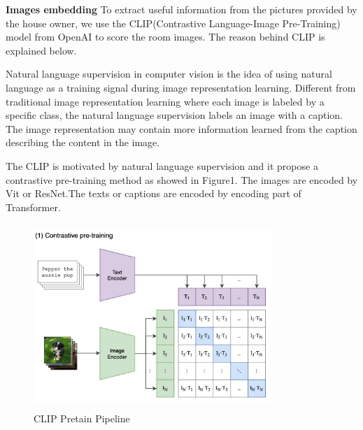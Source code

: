 \documentclass[final]{cvpr}
\begin{document}
\textbf{Images embedding}
To extract useful information from the pictures provided by the house owner, we use the CLIP(Contrastive Language-Image Pre-Training) model from OpenAI \cite{ref1} to score the room images. The reason behind CLIP is explained below.

Natural language supervision in computer vision is the idea of using natural language as a training signal during image representation learning. Different from traditional image representation learning where each image is labeled by a specific class, the natural language supervision labels an image with a caption. The image representation may contain more information learned from the caption describing the content in the image.

The CLIP is motivated by natural language supervision and it propose a contrastive pre-training method as showed in Figure1. The images are encoded by Vit\cite{ref2} or ResNet\cite{ref3}.The texts or captions are encoded by encoding part of Transformer\cite{ref4}.

\begin{figure}[h]
\centering
\includegraphics[width=9cm,height=7cm]{p1.jpg}
\caption{CLIP Pretain Pipeline}
\end{figure}
\end{document}
